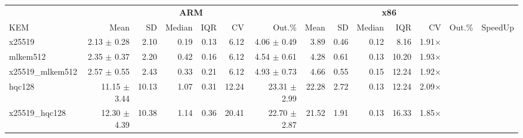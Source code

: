 \begin{table}[!ht]
\centering
\begin{tabular}{l|rrrrrr|rrrrrr|r}
\toprule
& \multicolumn{6}{c}{\bfseries ARM} & \multicolumn{6}{c}{\bfseries x86} & \\
\cmidrule(lr){2-7} \cmidrule(lr){8-13}
KEM & Mean & SD & Median & IQR & CV & Out.\% & Mean & SD & Median & IQR & CV & Out.\% & SpeedUp \\
\midrule
x25519 			& 2.13 $\pm$  0.28 & 2.10 & 0.19 & 0.13 & 6.12 & 4.06 $\pm$  0.49 & 3.89 & 0.46 & 0.12 & 8.16 & 1.91× \\
mlkem512 		& 2.35 $\pm$  0.37 & 2.20 & 0.42 & 0.16 & 6.12 & 4.54 $\pm$  0.61 & 4.28 & 0.61 & 0.13 & 10.20 & 1.93× \\
x25519_mlkem512 & 2.57 $\pm$  0.55 & 2.43 & 0.33 & 0.21 & 6.12 & 4.93 $\pm$  0.73 & 4.66 & 0.55 & 0.15 & 12.24 & 1.92× \\
hqc128 			& 11.15 $\pm$  3.44 & 10.13 & 1.07 & 0.31 & 12.24 & 23.31 $\pm$  2.99 & 22.28 & 2.72 & 0.13 & 12.24 & 2.09× \\
x25519_hqc128 	& 12.30 $\pm$  4.39 & 10.38 & 1.14 & 0.36 & 20.41 & 22.70 $\pm$  2.87 & 21.52 & 1.91 & 0.13 & 16.33 & 1.85× \\
\bottomrule
\end{tabular}
\end{table}
